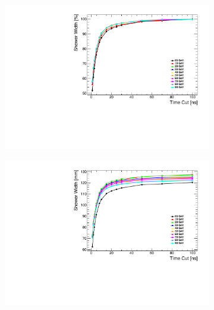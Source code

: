 \begin{figure}[htbp!]
  \centering
  \begin{subfigure}[t]{0.48\textwidth}
    \centering
    \includegraphics[width=1\linewidth]{../Thesis_Plots/ILD/NoSmearing/Plots/ShowerWidth_TimeCuts_noSmearing}
    \caption{} \label{fig:ShowerWidthNoSmearing}
  \end{subfigure}
  \begin{subfigure}[t]{0.48\textwidth}
    \centering
    \includegraphics[width=1\linewidth]{../Thesis_Plots/ILD/NoSmearing/Plots/ShowerWidthAbso_TimeCuts_noSmearing}
    \caption{} \label{fig:ShowerWidthAbsoNoSmearing}
  \end{subfigure}
  \centering
  \begin{subfigure}[t]{0.48\textwidth}
    \centering

\end{subfigure}
\end{figure}

